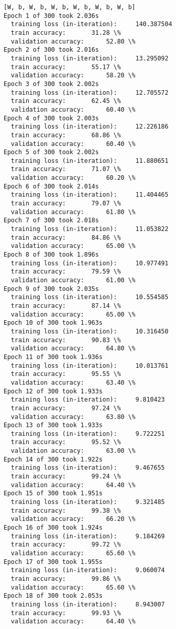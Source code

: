 \documentclass{article}
\begin{document}
    \begin{Verbatim}[commandchars=\\\{\}]
[W, b, W, b, W, b, W, b, W, b, W, b]
Epoch 1 of 300 took 2.036s
  training loss (in-iteration):		140.387504
  train accuracy:		31.28 \%
  validation accuracy:		52.80 \%
Epoch 2 of 300 took 2.016s
  training loss (in-iteration):		13.295092
  train accuracy:		55.17 \%
  validation accuracy:		58.20 \%
Epoch 3 of 300 took 2.002s
  training loss (in-iteration):		12.705572
  train accuracy:		62.45 \%
  validation accuracy:		60.40 \%
Epoch 4 of 300 took 2.003s
  training loss (in-iteration):		12.226186
  train accuracy:		68.86 \%
  validation accuracy:		60.40 \%
Epoch 5 of 300 took 2.002s
  training loss (in-iteration):		11.880651
  train accuracy:		71.07 \%
  validation accuracy:		60.20 \%
Epoch 6 of 300 took 2.014s
  training loss (in-iteration):		11.404465
  train accuracy:		79.07 \%
  validation accuracy:		61.80 \%
Epoch 7 of 300 took 2.018s
  training loss (in-iteration):		11.053822
  train accuracy:		84.86 \%
  validation accuracy:		65.00 \%
Epoch 8 of 300 took 1.896s
  training loss (in-iteration):		10.977491
  train accuracy:		79.59 \%
  validation accuracy:		61.00 \%
Epoch 9 of 300 took 2.035s
  training loss (in-iteration):		10.554585
  train accuracy:		87.14 \%
  validation accuracy:		65.00 \%
Epoch 10 of 300 took 1.963s
  training loss (in-iteration):		10.316450
  train accuracy:		90.83 \%
  validation accuracy:		64.80 \%
Epoch 11 of 300 took 1.936s
  training loss (in-iteration):		10.013761
  train accuracy:		95.55 \%
  validation accuracy:		63.40 \%
Epoch 12 of 300 took 1.933s
  training loss (in-iteration):		9.810423
  train accuracy:		97.24 \%
  validation accuracy:		63.80 \%
Epoch 13 of 300 took 1.933s
  training loss (in-iteration):		9.722251
  train accuracy:		95.52 \%
  validation accuracy:		63.00 \%
Epoch 14 of 300 took 1.922s
  training loss (in-iteration):		9.467655
  train accuracy:		99.24 \%
  validation accuracy:		64.40 \%
Epoch 15 of 300 took 1.951s
  training loss (in-iteration):		9.321485
  train accuracy:		99.38 \%
  validation accuracy:		66.20 \%
Epoch 16 of 300 took 1.924s
  training loss (in-iteration):		9.184269
  train accuracy:		99.72 \%
  validation accuracy:		65.60 \%
Epoch 17 of 300 took 1.955s
  training loss (in-iteration):		9.060074
  train accuracy:		99.86 \%
  validation accuracy:		65.60 \%
Epoch 18 of 300 took 2.053s
  training loss (in-iteration):		8.943007
  train accuracy:		99.93 \%
  validation accuracy:		64.40 \%
    \end{Verbatim}
\end{document}
